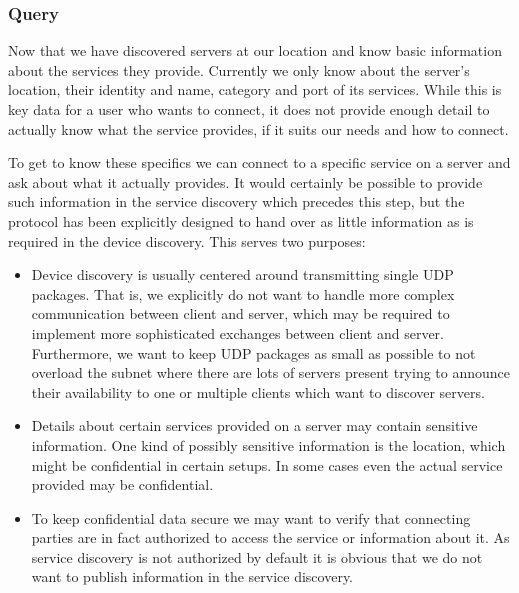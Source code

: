 

\subsubsection{Query}
\label{sec:query}

Now that we have discovered servers at our location and know basic information about the services they provide.
Currently we only know about the server's location, their identity and name, category and port of its services.
While this is key data for a user who wants to connect, it does not provide enough detail to actually know what the service provides, if it suits our needs and how to connect.

To get to know these specifics we can connect to a specific service on a server and ask about what it actually provides.
It would certainly be possible to provide such information in the service discovery which precedes this step, but the protocol has been explicitly designed to hand over as little information as is required in the device discovery.
This serves two purposes:
\begin{itemize}
    \item Device discovery is usually centered around transmitting single UDP packages.
        That is, we explicitly do not want to handle more complex communication between client and server, which may be required to implement more sophisticated exchanges between client and server.
        Furthermore, we want to keep UDP packages as small as possible to not overload the subnet where there are lots of servers present trying to announce their availability to one or multiple clients which want to discover servers.
    \item Details about certain services provided on a server may contain sensitive information.
        One kind of possibly sensitive information is the location, which might be confidential in certain setups.
        In some cases even the actual service provided may be confidential.
    \item To keep confidential data secure we may want to verify that connecting parties are in fact authorized to access the service or information about it.
        As service discovery is not authorized by default it is obvious that we do not want to publish information in the service discovery.
\end{itemize}

